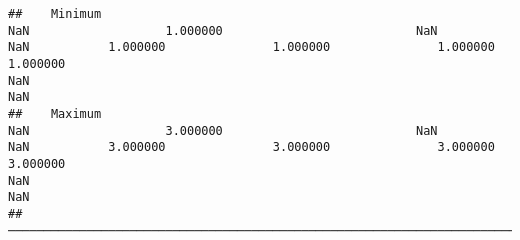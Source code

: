 \documentclass[
]{article}
\begin{document}
\begin{verbatim}
##    Minimum                                                                  NaN                   1.000000                           NaN                                                                  NaN           1.000000               1.000000               1.000000               1.000000                                                                  NaN                                                                  NaN   
##    Maximum                                                                  NaN                   3.000000                           NaN                                                                  NaN           3.000000               3.000000               3.000000               3.000000                                                                  NaN                                                                  NaN   
##  ────────────────────────────────────────────────────────────────────────────────────────────────────────────────────────────────────────────────────────────────────────────────────────────────────────────────────────────────────────────────────────────────────────────────────────────────────────────────────────────────────────────────────────────────────────────────────────────────────────────────────────────────────────────────
\end{verbatim}
\end{document}
